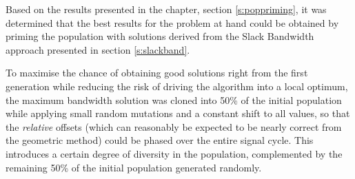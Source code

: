 Based on the results presented in the  chapter, section \ref{s:poppriming}, it was determined that the best results for the problem at hand could be obtained by priming the population with solutions derived from the Slack Bandwidth approach presented in section \ref{s:slackband}.

To maximise the chance of obtaining good solutions right from the first generation while reducing the risk of driving the algorithm into a local optimum, the maximum bandwidth solution was cloned into 50\% of the initial population while applying small random mutations and a constant shift to all values, so that the \emph{relative} offsets (which can reasonably be expected to be nearly correct from the geometric method) could be phased over the entire signal cycle. This introduces a certain degree of diversity in the population, complemented by the remaining 50\% of the initial population generated randomly.




